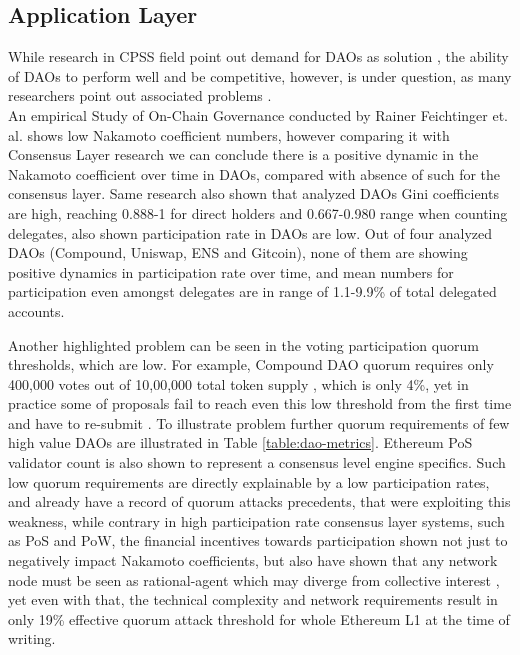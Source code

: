 \documentclass{article}
\begin{document}
\begin{CJK}{UTF8}{gbsn}
\begin{multicols}{2}
        \subsection{Application Layer}
        While research in CPSS field point out demand for DAOs as solution \cite{Fei2016}\cite{Wang2022}\cite{Juanjuan2023}, the ability of DAOs to perform well and be competitive, however, is under question, as many researchers point out associated problems \cite{Rainer2023}\cite{Marcella2016}\cite{Xuan2024}.  \\An empirical Study of On-Chain Governance conducted by Rainer Feichtinger et. al. \cite{Rainer2023} shows low Nakamoto coefficient numbers, however comparing it with Consensus Layer research \cite{Dominic2023} we can conclude there is a positive dynamic in the Nakamoto coefficient over time in DAOs, compared with absence of such for the consensus layer. Same research\cite{Rainer2023} also shown that analyzed DAOs Gini coefficients\cite{Lidia2012} are high, reaching 0.888-1 for direct holders and 0.667-0.980 range when counting delegates, also shown participation rate in DAOs are low. Out of four analyzed DAOs (Compound, Uniswap, ENS and Gitcoin), none of them are showing positive dynamics in participation rate over time, and mean numbers for participation even amongst delegates are in range of 1.1-9.9\% of total delegated accounts.


        Another highlighted problem can be seen in the voting participation quorum thresholds, which are low. For example, Compound DAO quorum requires only 400,000 \cite{CompDAO} votes out of 10,00,000 total token supply \cite{CompToken}, which is only 4\%, yet in practice some of proposals fail to reach even this low threshold from the first time and have to re-submit \cite{CompProp232}\cite{CompProp237}. To illustrate problem further quorum requirements of few high value DAOs are illustrated in Table \ref*{table:dao-metrics}. Ethereum PoS validator count is also shown to represent a consensus level engine specifics. Such low quorum requirements are directly explainable by a low participation rates, and already have a record of quorum attacks \cite{AragonBlog}\cite{rhizoo2023} precedents, that were exploiting this weakness, while contrary in high participation rate consensus layer systems, such as PoS and PoW, the financial incentives towards participation shown not just to negatively impact  Nakamoto coefficients, but also have shown that any network node must be seen as rational-agent which may diverge from collective interest \cite{Philip2019}, yet even with that, the technical complexity and network requirements result in only 19\% effective quorum attack threshold for whole Ethereum L1 at the time of writing.
        

\end{multicols}
\end{CJK}
\end{document}
